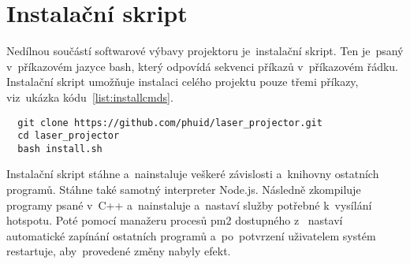 





\section{Instalační skript}
Nedílnou součástí softwarové výbavy projektoru je~instalační skript.
Ten je~psaný v~příkazovém jazyce bash, který odpovídá sekvenci příkazů v~příkazovém řádku.
Instalační skript umožňuje instalaci celého projektu pouze třemi příkazy, viz~ukázka kódu~\ref{list:installcmds}.

\begin{code}
\begin{minipage}{\textwidth{}}
\begin{verbatim}
  git clone https://github.com/phuid/laser_projector.git
  cd laser_projector
  bash install.sh
\end{verbatim}
\end{minipage}
\end{code}

Instalační skript stáhne a~nainstaluje veškeré závislosti a~knihovny ostatních programů. Stáhne také samotný interpreter Node.js.
Následně zkompiluje programy psané v~C++ a~nainstaluje a~nastaví služby potřebné k~vysílání hotspotu. Poté pomocí manažeru procesů pm2 dostupného z~\cite{pm2} nastaví automatické zapínání ostatních programů a~po~potvrzení uživatelem systém restartuje, aby~provedené změny nabyly efekt.
